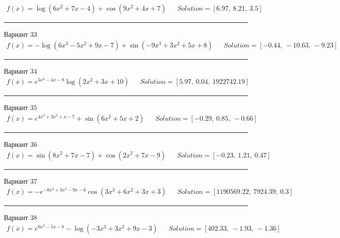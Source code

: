 \documentclass[11pt]{report}
\begin{document}
\begin{align*}
    f(x) = \log{\left(6 x^{2} + 7 x - 4 \right)} + \cos{\left(9 x^{2} + 4 x + 7 \right)} && Solution = \left[ 6.97, \  8.21, \  3.5\right]
\end{align*}
\begin{center}
    \noindent\rule{8cm}{0.4pt}
\end{center}
Вариант \(33\)
\begin{align*}
    f(x) = - \log{\left(6 x^{3} - 5 x^{2} + 9 x - 7 \right)} + \sin{\left(- 9 x^{3} + 3 x^{2} + 5 x + 8 \right)} && Solution = \left[ -0.44, \  -10.63, \  -9.23\right]
\end{align*}
\begin{center}
    \noindent\rule{8cm}{0.4pt}
\end{center}
Вариант \(34\)
\begin{align*}
    f(x) = e^{5 x^{2} - 4 x - 8} \log{\left(2 x^{2} + 3 x + 10 \right)} && Solution = \left[ 5.97, \  0.04, \  1922742.19\right]
\end{align*}
\begin{center}
    \noindent\rule{8cm}{0.4pt}
\end{center}
Вариант \(35\)
\begin{align*}
    f(x) = e^{4 x^{3} + 3 x^{2} + x - 7} + \sin{\left(6 x^{2} + 5 x + 2 \right)} && Solution = \left[ -0.29, \  0.85, \  -0.66\right]
\end{align*}
\begin{center}
    \noindent\rule{8cm}{0.4pt}
\end{center}
Вариант \(36\)
\begin{align*}
    f(x) = \sin{\left(8 x^{2} + 7 x - 7 \right)} + \cos{\left(2 x^{2} + 7 x - 9 \right)} && Solution = \left[ -0.23, \  1.21, \  0.47\right]
\end{align*}
\begin{center}
    \noindent\rule{8cm}{0.4pt}
\end{center}
Вариант \(37\)
\begin{align*}
    f(x) = - e^{- 8 x^{3} + 3 x^{2} - 9 x - 6} \cos{\left(3 x^{3} + 6 x^{2} + 3 x + 3 \right)} && Solution = \left[ 1190569.22, \  7924.39, \  0.3\right]
\end{align*}
\begin{center}
    \noindent\rule{8cm}{0.4pt}
\end{center}
Вариант \(38\)
\begin{align*}
    f(x) = e^{6 x^{2} - 5 x - 8} - \log{\left(- 3 x^{3} + 3 x^{2} + 9 x - 3 \right)} && Solution = \left[ 402.33, \  -1.93, \  -1.36\right]
\end{align*}
\end{document}
